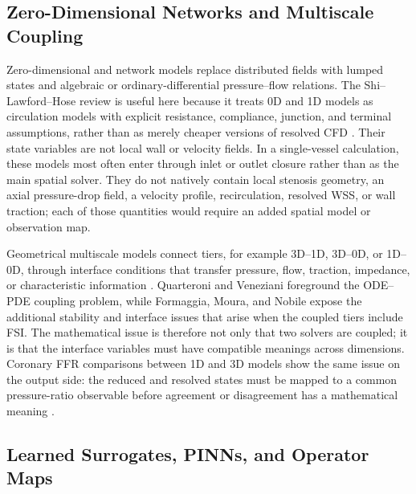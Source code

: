 \subsection{Zero-Dimensional Networks and Multiscale Coupling}
\label{subsec:network-multiscale-learned-models}

Zero-dimensional and network models replace distributed fields with lumped
states and algebraic or ordinary-differential pressure--flow relations. The
Shi--Lawford--Hose review is useful here because it treats 0D and 1D models as
circulation models with explicit resistance, compliance, junction, and terminal
assumptions, rather than as merely cheaper versions of resolved CFD
\cite{ShiEtAl2011BloodFlowModelReview,KopplHelmig2023DimensionReducedModeling,Wang2014BloodFlowNetworks}.
Their state variables are not local wall or velocity fields. In a single-vessel
calculation, these models most often enter through inlet or outlet closure
rather than as the main spatial solver. They do not natively contain local
stenosis geometry, an axial pressure-drop field, a velocity profile,
recirculation, resolved WSS, or wall traction; each of those quantities would
require an added spatial model or observation map.

Geometrical multiscale models connect tiers, for example 3D--1D, 3D--0D, or
1D--0D, through interface conditions that transfer pressure, flow, traction,
impedance, or characteristic information
\cite{QuarteroniVeneziani2003GeometricalMultiscale,FormaggiaEtAl2007FSICoupling}.
Quarteroni and Veneziani foreground the ODE--PDE coupling problem, while
Formaggia, Moura, and Nobile expose the additional stability and interface
issues that arise when the coupled tiers include FSI. The mathematical issue is
therefore not only that two solvers are coupled; it is that the interface
variables must have compatible meanings across dimensions. Coronary FFR
comparisons between 1D and 3D models show the same issue on the output side:
the reduced and resolved states must be mapped to a common pressure-ratio
observable before agreement or disagreement has a mathematical meaning
\cite{Blanco2018FFR1D3D}.

\subsection{Learned Surrogates, PINNs, and Operator Maps}
\label{subsec:learned-surrogates-operator-maps}

